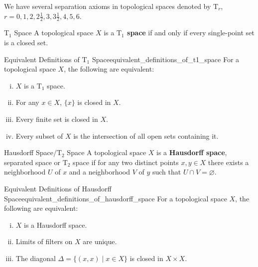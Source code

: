\documentclass{report}
\begin{document}
We have several separation axioms in topological spaces denoted by $\mathrm{T}_r$, $r=0,1,2,2\frac{1}{2},3,3\frac{1}{2},4,5,6$.

\begin{definition}{$\mathrm{T}_1$ Space}{}
	A topological space $X$ is a \textbf{$\mathrm{T}_1$ space} if and only if every single-point set is a closed set.
\end{definition}

\begin{proposition}{Equivalent Definitions of $\mathrm{T}_1$ Space}{equivalent_definitions_of_t1_space}
	For a topological space $X$, the following are equivalent:
	\begin{enumerate}[(i)]
		\item $X$ is a $\mathrm{T}_1$ space.
		\item For any $x\in X$, $\{x\}$ is closed in $X$.
		\item Every finite set is closed in $X$.
		\item Every subset of $X$ is the intersection of all open sets containing it.
	\end{enumerate}
	
\end{proposition}


\begin{definition}{Hausdorff Space/$\mathrm{T}_2$ Space}{}
	A topological space $X$ is a \textbf{Hausdorff space}, separated space or $\mathrm{T}_2$ space if for any two distinct points $x,y\in X$ there exists a neighborhood $U$ of $x$ and a neighborhood $V$ of $y$ such that $U\cap V=\varnothing$.
\end{definition}

\begin{proposition}{Equivalent Definitions of Hausdorff Space}{equivalent_definitions_of_hausdorff_space}
	For a topological space $X$, the following are equivalent:
	\begin{enumerate}[(i)]
		\item $X$ is a Hausdorff space.
		\item Limits of filters on $X$ are unique.
		\item The diagonal $\Delta=\{(x,x)\mid x\in X\}$ is closed in $X\times X$.
	\end{enumerate}
\end{proposition}
\end{document}

